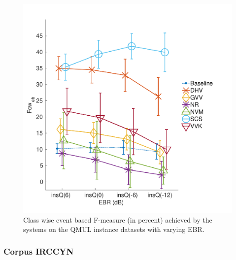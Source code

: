 \begin{figure}[t]
\begin{center}
\includegraphics[width=1\columnwidth]{gfx/ch_7/dcase2013_2}
\caption{Class wise event based F-measure (in percent) achieved by the systems on the QMUL instance datasets with varying EBR.}
\label{fig:ebr} 
\end{center}
\end{figure}

\subsubsection{Corpus IRCCYN}

